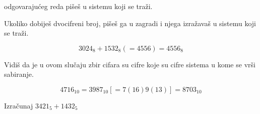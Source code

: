     odgovaraju\' ceg reda pi\v se\v s u sistemu koji se tra\v zi.



    Ukoliko dobije\v s dvocifreni broj, pi\v se\v s ga u zagradi i njega izra\v zava\v s u sistemu koji se tra\v zi.



    $$3024_8 + 1532_8 (= 4556) = 4556_8$$



    Vidi\v s da je u ovom slu\v caju zbir cifara su cifre koje su cifre sistema u kome se vr\v si sabiranje.



    $$4716_{10} = 3987_{10} [= 7 (16) 9 (13)] = 8703_{10}$$



    \begin{zad}

        Izra\v cunaj $3421_5 + 1432_5$

    \end{zad}




